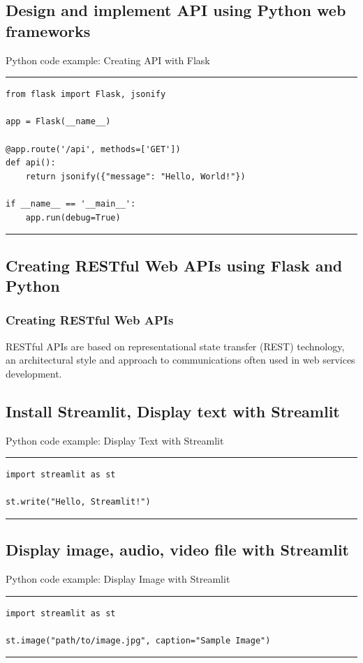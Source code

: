 \documentclass[aspectratio=169, hideothersubsections]{beamer}
\begin{document}
\subsection{Design and implement API using Python web frameworks}
\begin{frame}[fragile]{Python code example: Creating API with Flask}
\rule{\textwidth}{1pt}
\scriptsize
\begin{verbatim}
from flask import Flask, jsonify

app = Flask(__name__)

@app.route('/api', methods=['GET'])
def api():
    return jsonify({"message": "Hello, World!"})

if __name__ == '__main__':
    app.run(debug=True)
\end{verbatim}
\rule{\textwidth}{1pt}
\end{frame}

\subsection{Creating RESTful Web APIs using Flask and Python}
\begin{frame}
\frametitle{Creating RESTful Web APIs}
RESTful APIs are based on representational state transfer (REST) technology, an architectural style and approach to communications often used in web services development.
\end{frame}

\subsection{Install Streamlit, Display text with Streamlit}
\begin{frame}[fragile]{Python code example: Display Text with Streamlit}
\rule{\textwidth}{1pt}
\scriptsize
\begin{verbatim}
import streamlit as st

st.write("Hello, Streamlit!")
\end{verbatim}
\rule{\textwidth}{1pt}
\end{frame}

\subsection{Display image, audio, video file with Streamlit}
\begin{frame}[fragile]{Python code example: Display Image with Streamlit}
\rule{\textwidth}{1pt}
\scriptsize
\begin{verbatim}
import streamlit as st

st.image("path/to/image.jpg", caption="Sample Image")
\end{verbatim}
\rule{\textwidth}{1pt}
\end{frame}
\end{document}
